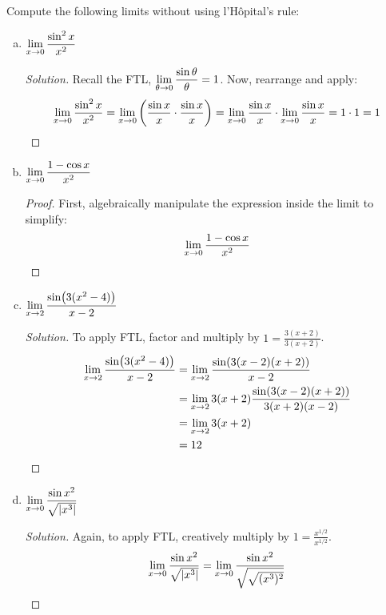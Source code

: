 \question Compute the following limits without using l'H\^{o}pital's rule:
\begin{enumerate}[(a)]
  \item $\displaystyle\lim_{x\to0} \frac{\sin^2 x}{x^2}$
        \begin{proof}[Solution]
          Recall the FTL, $\displaystyle\lim_{\theta\to0} \frac{\sin\theta}{\theta} = 1$.
          Now, rearrange and apply:
          \begin{equation*}
            \displaystyle\lim_{x\to0} \frac{\sin^2 x}{x^2}
            = \displaystyle\lim_{x\to0}\left(\frac{\sin x}{x}\cdot\frac{\sin x}{x}\right)
            = \displaystyle\lim_{x\to0}\frac{\sin x}{x} \cdot \displaystyle\lim_{x\to0}\frac{\sin x}{x}
            = 1 \cdot 1
            = 1 \qedhere
          \end{equation*}
        \end{proof}
  \item $\displaystyle\lim_{x\to0} \frac{1-\cos x}{x^2}$
        \begin{proof}
          First, algebraically manipulate the expression inside the limit to simplify:
          \begin{equation*}
            \displaystyle\lim_{x\to0} \frac{1-\cos x}{x^2}
          \end{equation*}
        \end{proof}
  \item $\displaystyle\lim_{x\to2} \frac{\sin(3(x^2-4))}{x-2}$
        \begin{proof}[Solution]
          To apply FTL, factor and multiply by $1=\frac{3(x+2)}{3(x+2)}$.
          \begin{align*}
            \displaystyle\lim_{x\to2} \frac{\sin(3(x^2-4))}{x-2}
             & = \displaystyle\lim_{x\to2} \frac{\sin(3(x-2)(x+2))}{x-2}               \\
             & = \displaystyle\lim_{x\to2} 3(x+2)\frac{\sin(3(x-2)(x+2))}{3(x+2)(x-2)} \\
             & = \displaystyle\lim_{x\to2} 3(x+2)                                      \\
             & = 12 \qedhere
          \end{align*}
        \end{proof}
  \item $\displaystyle\lim_{x\to0} \frac{\sin x^2}{\sqrt{|x^3|}}$
        \begin{proof}[Solution]
          Again, to apply FTL, creatively multiply by $1=\frac{x^{1/2}}{x^{1/2}}$.
          \begin{align*}
            \dlim{x}{0} \frac{\sin x^2}{\sqrt{|x^3|}}
             & = \dlim{x}{0} \frac{\sin x^2}{\sqrt{\sqrt{(x^3)^2}}} \\

\end{align*}
\end{proof}
\end{enumerate}
